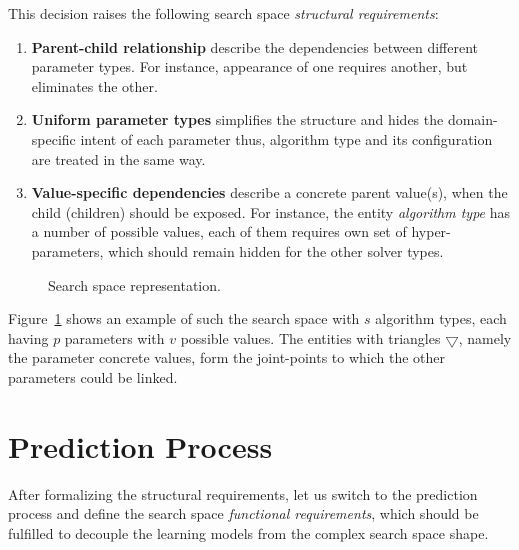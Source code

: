 This decision raises the following search space \emph{structural requirements}:
\begin{enumerate}[itemsep=8pt]
	\item[S.R.1] \textbf{Parent-child relationship} describe the dependencies between different parameter types. For instance, appearance of one requires another, but eliminates the other.

	\item[S.R.2] \textbf{Uniform parameter types} simplifies the structure and hides the domain-specific intent of each parameter thus, algorithm type and its configuration are treated in the same way.

	\item[S.R.3] \textbf{Value-specific dependencies} describe a concrete parent value(s), when the child (children) should be exposed. For instance, the entity \textit{algorithm type} has a number of possible values, each of them requires own set of hyper-parameters, which should remain hidden for the other solver types.
\end{enumerate}

\begin{figure}
	\centering
	
	\caption{Search space representation.}
	\label{concept:pict:Search Space Representation}
\end{figure}

Figure~\ref{concept:pict:Search Space Representation} shows an example of such the search space with $s$ algorithm types, each having $p$ parameters with $v$ possible values. The entities with triangles $\bigtriangledown$, namely the parameter concrete values, form the joint-points to which the other parameters could be linked. 


\section{Prediction Process}\label{concept:prediction}

After formalizing the structural requirements, let us switch to the prediction process and define the search space \emph{functional requirements}, which should be fulfilled to decouple the learning models from the complex search space shape.

